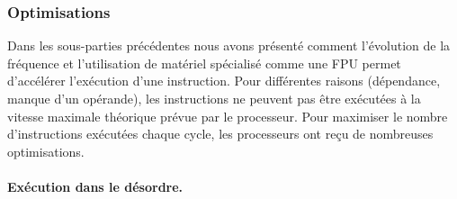         
        





    \subsubsection{Optimisations}

        Dans les sous-parties précédentes nous avons présenté comment l'évolution de la fréquence et l'utilisation de matériel spécialisé comme une FPU permet d'accélérer l'exécution d'une instruction. Pour différentes raisons (dépendance, manque d'un opérande), les instructions ne peuvent pas être exécutées à la vitesse maximale théorique prévue par le processeur. Pour maximiser le nombre d'instructions exécutées chaque cycle, les processeurs ont reçu de nombreuses optimisations. 

        \paragraph{Exécution dans le désordre.}\label{sec:out_of_order}
         

